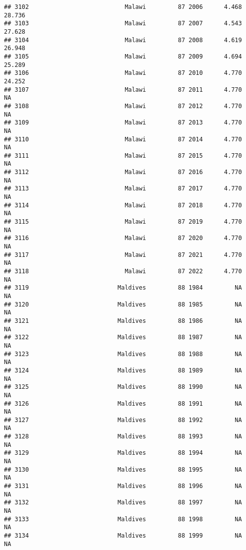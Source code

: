\documentclass[
]{article}
\begin{document}
\begin{verbatim}
## 3102                           Malawi         87 2006      4.468     28.736
## 3103                           Malawi         87 2007      4.543     27.628
## 3104                           Malawi         87 2008      4.619     26.948
## 3105                           Malawi         87 2009      4.694     25.289
## 3106                           Malawi         87 2010      4.770     24.252
## 3107                           Malawi         87 2011      4.770         NA
## 3108                           Malawi         87 2012      4.770         NA
## 3109                           Malawi         87 2013      4.770         NA
## 3110                           Malawi         87 2014      4.770         NA
## 3111                           Malawi         87 2015      4.770         NA
## 3112                           Malawi         87 2016      4.770         NA
## 3113                           Malawi         87 2017      4.770         NA
## 3114                           Malawi         87 2018      4.770         NA
## 3115                           Malawi         87 2019      4.770         NA
## 3116                           Malawi         87 2020      4.770         NA
## 3117                           Malawi         87 2021      4.770         NA
## 3118                           Malawi         87 2022      4.770         NA
## 3119                         Maldives         88 1984         NA         NA
## 3120                         Maldives         88 1985         NA         NA
## 3121                         Maldives         88 1986         NA         NA
## 3122                         Maldives         88 1987         NA         NA
## 3123                         Maldives         88 1988         NA         NA
## 3124                         Maldives         88 1989         NA         NA
## 3125                         Maldives         88 1990         NA         NA
## 3126                         Maldives         88 1991         NA         NA
## 3127                         Maldives         88 1992         NA         NA
## 3128                         Maldives         88 1993         NA         NA
## 3129                         Maldives         88 1994         NA         NA
## 3130                         Maldives         88 1995         NA         NA
## 3131                         Maldives         88 1996         NA         NA
## 3132                         Maldives         88 1997         NA         NA
## 3133                         Maldives         88 1998         NA         NA
## 3134                         Maldives         88 1999         NA         NA

\end{verbatim}
\end{document}
